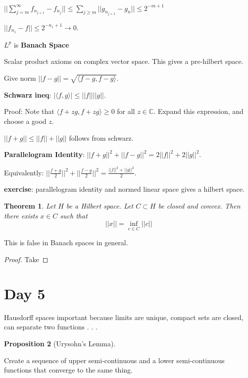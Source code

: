 \documentclass[11pt]{article}
\newtheorem{thm}{Theorem}[section]
\newtheorem{prop}[thm]{Proposition}
\newcommand{\ra}{\rightarrow}
\newcommand{\sbs}{\subset}
\newcommand{\al}{\alpha}
\newcommand{\su}[2]{\sum_{#1}^{#2}}
\newcommand{\fr}[2]{\frac{#1}{#2}}
\newcommand{\co}{\mathbb{C}}
\begin{document}
$||\su{j=m}{\infty}f_{n_{j+1}}-f_{n_j}||\le\su{j\ge m}{}||g_{n_{j+1}}-g_n||\le 2^{-m+1}$

$||f_{n_1}-f||\le 2^{-n_1+1}\ra 0$. 

$L^p$ is {\bf Banach Space}

Scalar product axioms on complex vector space. This gives a pre-hilbert space.

Give norm $||f-g||=\sqrt{\langle f-g,f-g\rangle}$.

{\bf Schwarz ineq}: 
$|\langle f,g\rangle|\le ||f||||g||$. 

Proof: Note that $\langle f+zg,f+zg\rangle\ge 0$ for all $z\in\co$. Expand this expression, and choose a good $z$. 

$||f+g||\le ||f||+||g||$ follows from schwarz. 

{\bf Parallelogram Identity}: $||f+g||^2+||f-g||^2=2||f||^2+2||g||^2$. 

Equivalently:  $||\fr{f+g}{2}||^2+||\fr{f-g}{2}||^2=\fr{||f||^2+||g||^2}{2}$. 

{\bf exercise}: parallelogram identity and normed linear space gives a hilbert space. 


\begin{thm}
Let $H$ be a Hilbert space. Let $C\sbs H$ be closed and convex. Then there exists $x\in C$ such that \[||x||=\inf_{c\in C}||c||\]
\end{thm}

This is false in Banach spaces in general.
\begin{proof}

Take 

\end{proof}

\section{Day 5}

Hausdorff spaces important because limits are unique, compact sets are closed, can separate two functions . . . 

\begin{prop}[Urysohn's Lemma]

\end{prop}
Create a sequence of upper semi-continuous and a lower semi-continuous functions that converge to the same thing. 
\end{document}

